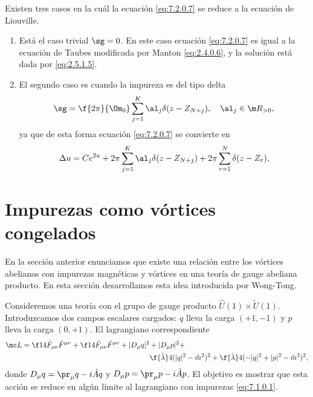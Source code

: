 Existen tres casos en la cuál la ecuación \eqref{eq:7.2.0.7} se reduce a la ecuación de Liouville.

\begin{enumerate}
	\item Está el caso trivial $\sg =0$. En este caso ecuación \eqref{eq:7.2.0.7} es igual a la ecuación de Taubes modificada por Manton \eqref{eq:2.4.0.6}, y la solución está dada por \eqref{eq:2.5.1.5}.
	
	\item El segundo caso es cuando la impureza es del tipo delta
	\begin{align}
		\sg = \f{2\pi}{\Om_0}\sum_{j=1}^K\al_j\delta(z-Z_{N+j}), \ \ \ \al_j\in\m R_{>0},
	\end{align}
	ya que de esta forma ecuación \eqref{eq:7.2.0.7} se convierte en
	\begin{align}
		\Delta u = Ce^{2u}+2\pi\sum_{j=1}^K\al_j\delta(z-Z_{N+j})+2\pi\sum_{r=1}^N\delta(z-Z_r),
	\end{align}
	
\end{enumerate}


\section{Impurezas como vórtices congelados}

En la sección anterior enunciamos que existe una relación entre los vórtices abelianos con impurezas magnéticas y vórtices en una teoría de gauge abeliana producto. En esta sección desarrollamos esta idea introducida por Wong-Tong.

Consideremos una teoría con el grupo de gauge producto $\hat U(1)\times \tilde U(1)$. Introduzcamos dos campos escalares cargados: $q$ lleva la carga $(+1,-1)$ y $p$ lleva la carga $(0,+1)$. El lagrangiano correspondiente
\begin{align}
	\mc L = \f 14\hat F_{\mu\nu}\hat F^{\mu\nu}+\f 14\tilde F_{\mu\nu}\tilde F^{\mu\nu}+|D_\mu q|^2 &+|D_\mu p|^2+\nonumber\\
	&\f{\hat\lambda}4(|q|^2-\hat m^2)^2+\f{\tilde\lambda}4(-|q|^2+|p|^2-\tilde m^2)^2,
\end{align}
donde $D_\mu q=\pr_\mu q-i \hat Aq$ y $D_\mu p=\pr_\mu p-i\tilde A p$. El objetivo es mostrar que esta acción se reduce en algún límite al lagrangiano con impurezas \eqref{eq:7.1.0.1}.

